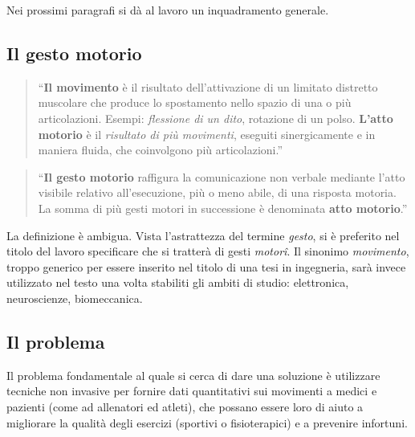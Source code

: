 Nei prossimi paragrafi si dà al lavoro un inquadramento generale.


	\subsection{Il gesto motorio} \label{ssez:definizione}

\begin{quotation}
	``\textbf{Il movimento} è il risultato dell'attivazione
	di un limitato distretto muscolare che produce lo spostamento nello spazio
	di una o più articolazioni.
	Esempi: \emph{flessione di un dito}, rotazione di un polso.
	\textbf{L'atto motorio} è il \emph{risultato di più movimenti},
	eseguiti sinergicamente e in maniera fluida, che coinvolgono più articolazioni.'' 
\cite{cit:mandolesi}
\end{quotation} 

\begin{quotation}
	``\textbf{Il gesto motorio} raffigura la comunicazione non verbale
	mediante l'atto visibile relativo all'esecuzione,
	più o meno abile, di una risposta motoria.
	La somma di più gesti motori in successione è denominata \textbf{atto motorio}.''
\cite{cit:lestini}
\end{quotation}

La definizione è ambigua.
Vista l'astrattezza del termine \emph{gesto},
si è preferito nel titolo del lavoro specificare che si tratterà di gesti \emph{motor\^i}.
Il sinonimo \emph{movimento},
troppo generico per essere inserito nel titolo di una tesi in ingegneria,
sarà invece utilizzato nel testo
una volta stabiliti gli ambiti di studio: elettronica, neuroscienze, biomeccanica.





	\subsection{Il problema}\label{rif:problema}

Il problema fondamentale al quale si cerca di dare una soluzione
è utilizzare tecniche non invasive per fornire dati quantitativi sui movimenti
a medici e pazienti (come ad allenatori ed atleti),
che possano essere loro di aiuto a migliorare la qualità degli esercizi
(sportivi o fisioterapici)
e a prevenire infortuni.

